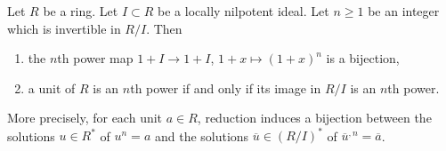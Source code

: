 \begin{lemma}
\label{lemma-lift-nth-roots}
Let $R$ be a ring. Let $I \subset R$ be a locally nilpotent ideal.
Let $n \geq 1$ be an integer which is invertible in $R/I$. Then
\begin{enumerate}
\item the $n$th power map $1 + I \to 1 + I$, $1 + x \mapsto (1 + x)^n$
is a bijection,
\item a unit of $R$ is an $n$th power if and only if its image in $R/I$
is an $n$th power.
\end{enumerate}
More precisely, for each unit $a\in R$, reduction induces a bijection
between the solutions $u\in R^*$ of $u^n=a$ and the solutions
$\overline u\in(R/I)^*$ of $\overline u^{,n}=\overline a$.
\end{lemma}

